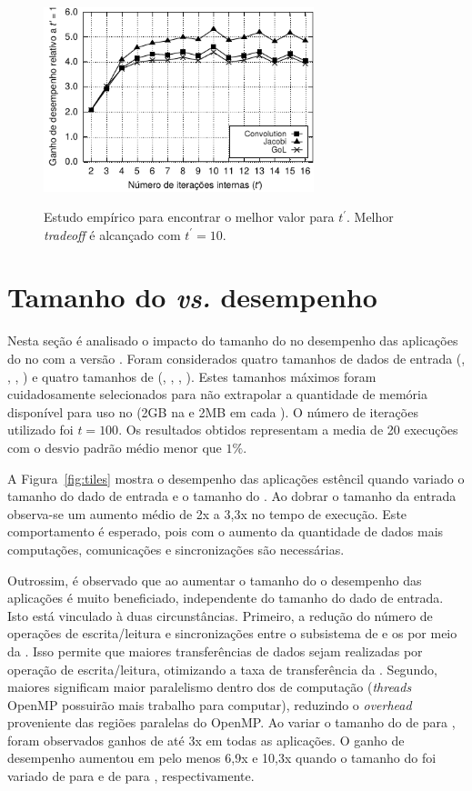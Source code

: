 \begin{figure}
  \centering
	\caption{Estudo empírico para encontrar o melhor valor para $t^\prime$. Melhor \textit{tradeoff} é alcançado com $t^\prime=10$.}
	\includegraphics[width=0.7\textwidth]{figs/MPPAPlotIterationsAPI100It16InnerIt.pdf}
	\label{fig:tprime}
\end{figure}

\section{Tamanho do \tile \textit{vs.} desempenho}
\label{sec:tam_tile_desempenho}

Nesta seção é analisado o impacto do tamanho do \tile no desempenho das aplicações do \pskel no \mppa com a versão \async. Foram considerados quatro tamanhos de dados de entrada (\ina, \inb, \inc, \ind) e quatro tamanhos de \tiles (\tilea, \tileb, \tilec, \tiled). Estes tamanhos máximos foram cuidadosamente selecionados para não extrapolar a quantidade de memória disponível para uso no \mppa (2GB na \lpddr e 2MB em cada \cluster). O número de iterações utilizado foi $t = 100$. Os resultados obtidos representam a media de 20 execuções com o desvio padrão médio menor que $1\%$. 

A Figura~\ref{fig:tiles} mostra o desempenho das aplicações estêncil quando variado o tamanho do dado de entrada e o tamanho do \tile. Ao dobrar o tamanho da entrada observa-se um aumento médio de 2x a 3,3x no tempo de execução. Este comportamento é esperado, pois com o aumento da quantidade de dados mais computações, comunicações e sincronizações são necessárias.

Outrossim, é observado que ao aumentar o tamanho do \tile o desempenho das aplicações é muito beneficiado, independente do tamanho do dado de entrada. Isto está vinculado à duas circunstâncias. Primeiro, a redução do número de operações de escrita/leitura e sincronizações entre o subsistema de \io e os \clusters por meio da \noc. Isso permite que maiores transferências de dados sejam realizadas por operação de escrita/leitura, otimizando a taxa de transferência da \noc. Segundo, maiores \tiles significam maior paralelismo dentro dos \clusters de computação (\ie \textit{threads} OpenMP possuirão mais trabalho para computar), reduzindo o \textit{overhead} proveniente das regiões paralelas do OpenMP. Ao variar o tamanho do \tile de \tilea para \tileb, foram observados ganhos de até 3x em todas as aplicações. O ganho de desempenho aumentou em pelo menos 6,9x e 10,3x quando o tamanho do \tile foi variado de \tilea para \tilec e de \tilea para \tiled, respectivamente.

